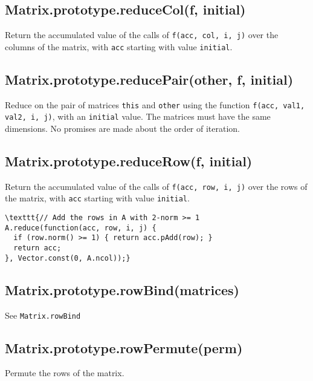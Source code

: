 \documentclass{article}
\begin{document}
    \subsection*{Matrix.prototype.reduceCol(f, initial)}
    Return the accumulated value of the calls of \texttt{f(acc, col, i, j)} over the columns
of the matrix, with \texttt{acc} starting with value \texttt{initial}.


    \subsection*{Matrix.prototype.reducePair(other, f, initial)}
    Reduce on the pair of matrices \texttt{this} and \texttt{other} using the function
\texttt{f(acc, val1, val2, i, j)}, with an \texttt{initial} value.
The matrices must have the same dimensions. No promises are made about the order of
iteration.


    \subsection*{Matrix.prototype.reduceRow(f, initial)}
    Return the accumulated value of the calls of \texttt{f(acc, row, i, j)} over the rows
of the matrix, with \texttt{acc} starting with value \texttt{initial}.


\begin{lstlisting}
\texttt{// Add the rows in A with 2-norm >= 1
A.reduce(function(acc, row, i, j) {
  if (row.norm() >= 1) { return acc.pAdd(row); }
  return acc;
}, Vector.const(0, A.ncol));}\end{lstlisting}

    \subsection*{Matrix.prototype.rowBind(matrices)}
    See \texttt{Matrix.rowBind}


    \subsection*{Matrix.prototype.rowPermute(perm)}
    Permute the rows of the matrix.
\end{document}
